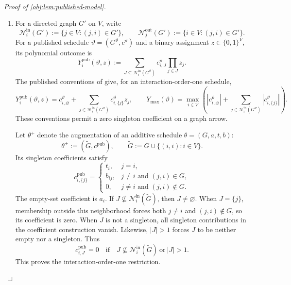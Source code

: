 \begin{proof}[Proof of \cref{obj:lem:published-model}]
\begin{enumerate}
\item For a directed graph \(G'\) on \(V\), write
\[
\mathcal N^{\mathrm{in}}_i(G')
:=\{j\in V:(j,i)\in G'\},
\qquad
\mathcal N^{\mathrm{out}}_j(G')
:=\{i\in V:(j,i)\in G'\}.
\]
For a published schedule \(\vartheta=(G^\vartheta,c^\vartheta)\) and a binary assignment \(z\in\{0,1\}^V\), its polynomial outcome is
\[
Y_i^{\mathrm{pub}}(\vartheta,z)
:=
\sum_{J\subseteq\mathcal N^{\mathrm{in}}_i(G^\vartheta)}
c^\vartheta_{i,J}\prod_{j\in J}z_j.
\]
The published conventions of
\citep[Sections 3.1--3.2, Assumptions 1--2, equations (3.2)--(3.3)]{CortezRodriguezEichhornYu2023SNIPE}
give, for an interaction-order-one schedule,
\[
Y_i^{\mathrm{pub}}(\vartheta,z)
=
c^\vartheta_{i,\varnothing}
+\sum_{j\in\mathcal N^{\mathrm{in}}_i(G^\vartheta)}
c^\vartheta_{i,\{j\}}z_j,
\qquad
Y_{\max}(\vartheta)
=
\max_{i\in V}
\left(
|c^\vartheta_{i,\varnothing}|
+\sum_{j\in\mathcal N^{\mathrm{in}}_i(G^\vartheta)}
|c^\vartheta_{i,\{j\}}|
\right).
\]
These conventions permit a zero singleton coefficient on a graph arrow.

Let \(\theta^+\) denote the augmentation of an additive schedule \(\theta=(G,a,t,b)\):
\[
\theta^+:=(\widetilde G,c^{\mathrm{pub}}),
\qquad
\widetilde G:=G\cup\{(i,i):i\in V\}.
\]
Its singleton coefficients satisfy
\[
c^{\mathrm{pub}}_{i,\{j\}}
=
\begin{cases}
t_i,&j=i,\\
b_{ij},&j\ne i\text{ and }(j,i)\in G,\\
0,&j\ne i\text{ and }(j,i)\notin G.
\end{cases}
\]
The empty-set coefficient is \(a_i\). If
\(J\not\subseteq\mathcal N^{\mathrm{in}}_i(\widetilde G)\), then \(J\ne\varnothing\).
When \(J=\{j\}\), membership outside this neighborhood forces both
\(j\ne i\) and \((j,i)\notin G\), so its coefficient is zero.
When \(J\) is not a singleton, all singleton contributions in the coefficient construction vanish. Likewise, \(|J|>1\) forces \(J\) to be neither empty nor a singleton. Thus
\[
c^{\mathrm{pub}}_{i,J}=0
\quad\text{if}\quad
J\not\subseteq\mathcal N^{\mathrm{in}}_i(\widetilde G)
\ \text{or}\ |J|>1.
\]
This proves the interaction-order-one restriction.


\end{enumerate}
\end{proof}
